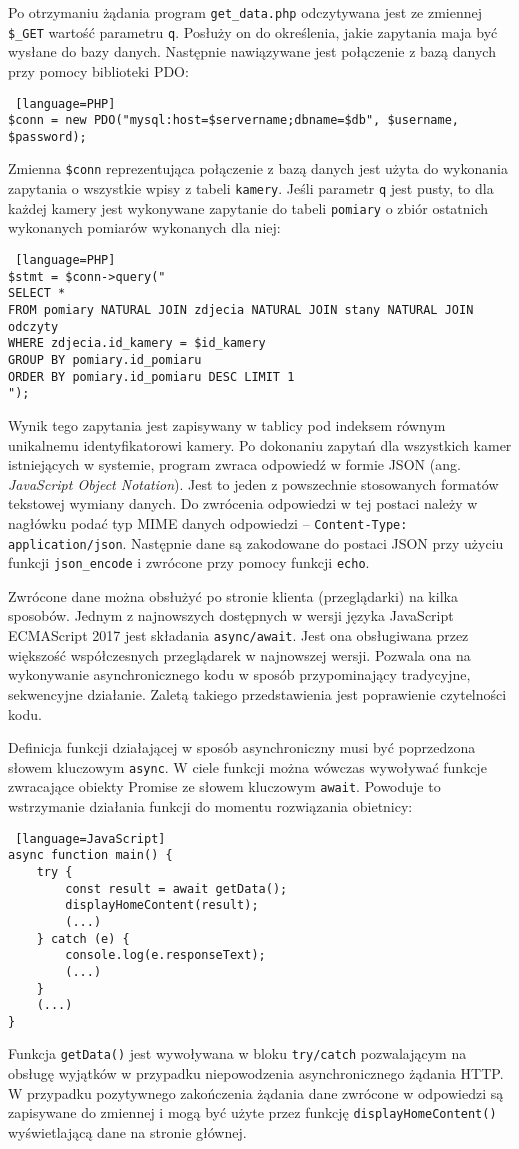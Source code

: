 \documentclass[a4paper,12pt,twoside]{article}
\begin{document}
Po otrzymaniu żądania program \texttt{get{\_}data.php} odczytywana jest ze zmiennej \texttt{{\$\_}GET} wartość parametru \texttt{q}. Posłuży on do określenia, jakie zapytania maja być wysłane do bazy danych. Następnie nawiązywane jest połączenie z bazą danych przy pomocy biblioteki PDO:
\begin{lstlisting} [language=PHP]
$conn = new PDO("mysql:host=$servername;dbname=$db", $username, $password);
\end{lstlisting}
Zmienna \texttt{\$conn} reprezentująca połączenie z bazą danych jest użyta do wykonania zapytania o wszystkie wpisy z tabeli \texttt{kamery}. Jeśli parametr \texttt{q} jest pusty, to dla każdej kamery jest wykonywane zapytanie do tabeli \texttt{pomiary} o zbiór ostatnich wykonanych pomiarów wykonanych dla niej:
\begin{lstlisting} [language=PHP]
$stmt = $conn->query("
SELECT *
FROM pomiary NATURAL JOIN zdjecia NATURAL JOIN stany NATURAL JOIN odczyty
WHERE zdjecia.id_kamery = $id_kamery 
GROUP BY pomiary.id_pomiaru 
ORDER BY pomiary.id_pomiaru DESC LIMIT 1
");
\end{lstlisting}
Wynik tego zapytania jest zapisywany w tablicy pod indeksem równym unikalnemu identyfikatorowi kamery. Po dokonaniu zapytań dla wszystkich kamer istniejących w systemie, program zwraca odpowiedź w formie JSON (ang. \textit{JavaScript Object Notation}). Jest to jeden z powszechnie stosowanych formatów tekstowej wymiany danych. Do zwrócenia odpowiedzi w tej postaci należy w nagłówku podać typ MIME danych odpowiedzi\cite{mime2} -- \texttt{Content-Type: application/json}. Następnie dane są zakodowane do postaci JSON przy użyciu funkcji \texttt{json{\_}encode} i zwrócone przy pomocy funkcji \texttt{echo}.

Zwrócone dane można obsłużyć po stronie klienta (przeglądarki) na kilka sposobów. Jednym z najnowszych dostępnych w wersji języka JavaScript ECMAScript 2017 jest składania \texttt{async/await}. Jest ona obsługiwana przez większość współczesnych przeglądarek w najnowszej wersji.\cite{async} Pozwala ona na wykonywanie asynchronicznego kodu w sposób przypominający tradycyjne, sekwencyjne działanie. Zaletą takiego przedstawienia jest poprawienie czytelności kodu. 

Definicja funkcji działającej w sposób asynchroniczny musi być poprzedzona słowem kluczowym \texttt{async}. W ciele funkcji można wówczas wywoływać funkcje zwracające obiekty Promise ze słowem kluczowym \texttt{await}. Powoduje to wstrzymanie działania funkcji do momentu rozwiązania obietnicy:
\begin{lstlisting} [language=JavaScript]
async function main() {
    try {
        const result = await getData();
        displayHomeContent(result);
        (...)
    } catch (e) {
        console.log(e.responseText);
        (...)
    }
	(...)
}
\end{lstlisting}
Funkcja \texttt{getData()} jest wywoływana w bloku \texttt{try/catch} pozwalającym na obsługę wyjątków w przypadku niepowodzenia asynchronicznego żądania HTTP. W przypadku pozytywnego zakończenia żądania dane zwrócone w odpowiedzi są zapisywane do zmiennej i mogą być użyte przez funkcję \texttt{displayHomeContent()} wyświetlającą dane na stronie głównej.
\end{document}
